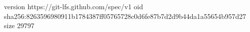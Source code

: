 version https://git-lfs.github.com/spec/v1
oid sha256:8263596980911b1784387ff05765728c0d6fe87b7d2d9b44da1a55654b957d27
size 29797
